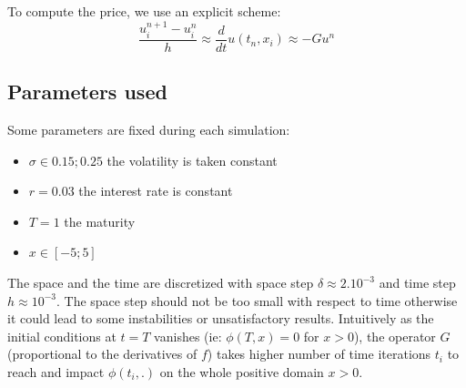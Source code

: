 \documentclass{article}
\begin{document}
To compute the price, we use an explicit scheme:
\[
	\frac{u_{i}^{n+1} -u_{i}^{n}}{h} \approx \frac{d}{dt} u(t_n,x_i)\approx -Gu^{n}
\]

\subsection*{Parameters used}

Some parameters are fixed during each simulation:

\begin{itemize}[label=$\cdot$]
    \item $\sigma\in{0.15;0.25}$ the volatility is taken constant
    \item $r=0.03$ the interest rate is constant 
    \item $T=1$ the maturity
    \item $x\in[-5;5]$ 
\end{itemize}

The space and the time are discretized with  space step $\delta \approx 2.10^{-3}$ and time step $h \approx 10^{-3}$.
The space step should not be too small with respect to time otherwise it could lead to some instabilities or unsatisfactory
results. Intuitively as the initial conditions at $t=T$ vanishes (ie: $\phi(T,x) = 0$ for $x > 0$),
the operator $G$ (proportional to the derivatives of $f$) takes higher number of time iterations $t_i$
to reach and impact $\phi(t_i,.)$ on the whole positive domain $x>0$.
\\
\end{document}
